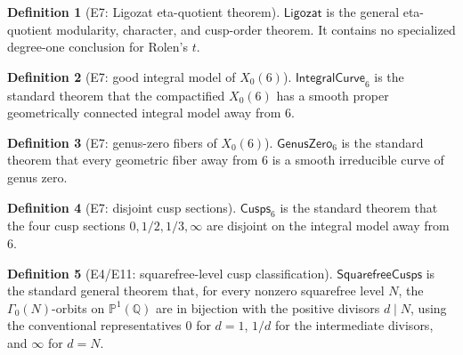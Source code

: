 \documentclass[11pt,a4paper]{article}
\numberwithin{equation}{section}
\theoremstyle{plain}\newtheorem{theorem}{Theorem}[section]\newaliascnt{proposition}{theorem}\newtheorem{proposition}[proposition]{Proposition}\aliascntresetthe{proposition}\newaliascnt{lemma}{theorem}\newtheorem{lemma}[lemma]{Lemma}\aliascntresetthe{lemma}
\theoremstyle{definition}\newaliascnt{definition}{theorem}\newtheorem{definition}[definition]{Definition}\aliascntresetthe{definition}\newaliascnt{notation}{theorem}\newtheorem{notation}[notation]{Notation}\aliascntresetthe{notation}
\providecommand{\lean}[1]{}\providecommand{\leanok}{}
\begin{document}
\begin{definition}[E7: Ligozat eta-quotient theorem]\label{def_ext_ligozat_curve}\lean{SptCM.RolenLiterature.LigozatEtaQuotients}\leanok
$\mathsf{Ligozat}$ is the general eta-quotient modularity, character, and cusp-order theorem.  It contains no specialized degree-one conclusion for Rolen's $t$.
\end{definition}
\begin{definition}[E7: good integral model of $X_0(6)$]\label{def_ext_x0_six_integral}\lean{SptCM.RolenLiterature.X0SixGoodIntegralModel}\leanok
$\mathsf{IntegralCurve}_6$ is the standard theorem that the compactified $X_0(6)$ has a smooth proper geometrically connected integral model away from $6$.
\end{definition}
\begin{definition}[E7: genus-zero fibers of $X_0(6)$]\label{def_ext_x0_six_genus_zero}\lean{SptCM.RolenLiterature.X0SixGenusZeroFibers}\leanok
$\mathsf{GenusZero}_6$ is the standard theorem that every geometric fiber away from $6$ is a smooth irreducible curve of genus zero.
\end{definition}
\begin{definition}[E7: disjoint cusp sections]\label{def_ext_x0_six_cusps}\lean{SptCM.RolenLiterature.X0SixDisjointCusps}\leanok
$\mathsf{Cusps}_6$ is the standard theorem that the four cusp sections $0,1/2,1/3,\infty$ are disjoint on the integral model away from $6$.
\end{definition}
\begin{definition}[E4/E11: squarefree-level cusp classification]\label{def_ext_squarefree_cusps}\lean{SptCM.RolenLiterature.SquarefreeGammaZeroCuspClassification}\leanok
$\mathsf{SquarefreeCusps}$ is the standard general theorem that, for every
nonzero squarefree level $N$, the $\Gamma_0(N)$-orbits on
$\mathbb P^1(\mathbb Q)$ are in bijection with the positive divisors $d\mid
N$, using the conventional representatives $0$ for $d=1$, $1/d$ for the
intermediate divisors, and $\infty$ for $d=N$.
\end{definition}
\end{document}
